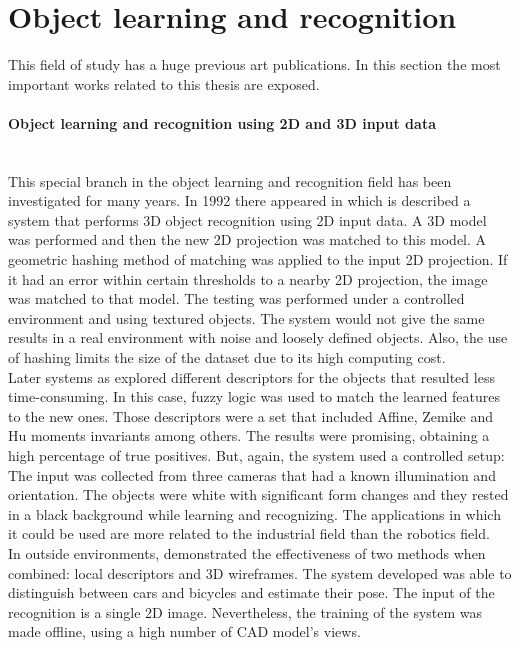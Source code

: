 \section{Object learning and recognition}

This field of study has a huge previous art publications. 
In this section the most important works related to this thesis are exposed. 

\paragraph{Object learning and recognition using 2D and 3D input data}\mbox{}\\

This special branch in the object learning and recognition field has been investigated for many years. 
In 1992 there appeared \cite{D.M.Gavrila1991} in which is described a system that performs 3D object recognition using 2D input data. 
A 3D model was performed and then the new 2D projection was matched to this model.
A geometric hashing method of matching was applied to the input 2D projection. 
If it had an error within certain thresholds to a nearby 2D projection, the image was matched to that model. 
The testing was performed under a controlled environment and using textured objects. 
The system would not give the same results in a real environment with noise and loosely defined objects. 
Also, the use of hashing limits the size of the dataset due to its high computing cost. 
\\

Later systems as \cite{Sheta2012} explored different descriptors for the objects that resulted less time-consuming. 
In this case, fuzzy logic was used to match the learned features to the new ones. 
Those descriptors were a set that included Affine, Zemike and Hu moments invariants among others. 
The results were promising, obtaining a high percentage of true positives. 
But, again, the system used a controlled setup:
The input was collected from three cameras that had a known illumination and orientation. 
The objects were white with significant form changes and they rested in a black background while learning and recognizing. 
The applications in which it could be used are more related to the industrial field than the robotics field. 
\\

In outside environments, \cite{Zia2013} demonstrated the effectiveness of two methods when combined: local descriptors and 3D wireframes. 
The system developed was able to distinguish between cars and bicycles and estimate their pose. 
The input of the recognition is a single 2D image. 
Nevertheless, the training of the system was made offline, using a high number of CAD model's views. 

